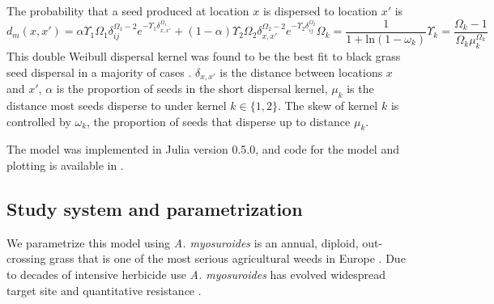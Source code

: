 \documentclass[10pt,letterpaper]{article}
\begin{document}
The probability that a seed produced at location $x$ is dispersed to location $x'$ is 
\begin{subequations}\label{eq:seed_disp}
\begin{equation}\label{eq:seed_kern}
	d_m(x, x') = \alpha \Upsilon_1 \Omega_1 \delta_{ij}^{\Omega_1 - 2} e^{-\Upsilon_1 \delta_{x,x'}^{\Omega_1}} + (1 - \alpha) \Upsilon_2 \Omega_2 \delta_{x,x'}^{\Omega_2 - 2} e^{-\Upsilon_2 \delta_{ij}^{\Omega_2}}  
\end{equation}
\begin{equation}\label{eq:shape}
	\Omega_k = \frac{1}{1 + \text{ln}(1 - \omega_k)}
\end{equation}
\begin{equation}\label{eq:scale}
	\Upsilon_k = \frac{\Omega_k - 1}{\Omega_k \mu_k^{\Omega_k}}
\end{equation}
\end{subequations} 
This double Weibull dispersal kernel was found to be the best fit to black grass seed dispersal in a majority of cases \cite{Colb2001}. $\delta_{x,x'}$ is the distance between locations $x$ and $x'$, $\alpha$ is the proportion of seeds in the short dispersal kernel, $\mu_k$ is the distance most seeds disperse to under kernel $k \in \{1, 2\}$. The skew of kernel $k$ is controlled by $\omega_k$, the proportion of seeds that disperse up to distance $\mu_k$. 
 
The model was implemented in Julia version 0.5.0, and code for the model and plotting is available in .

\subsection*{Study system and parametrization}
We parametrize this model using \textit{A. myosuroides} is an annual, diploid, out-crossing grass that is one of the most serious agricultural weeds in Europe \cite{Moss2007}. Due to decades of intensive herbicide use \textit{A. myosuroides} has evolved widespread target site \cite{Moss2007} and quantitative resistance \cite{Yu2014}.   
\end{document}
